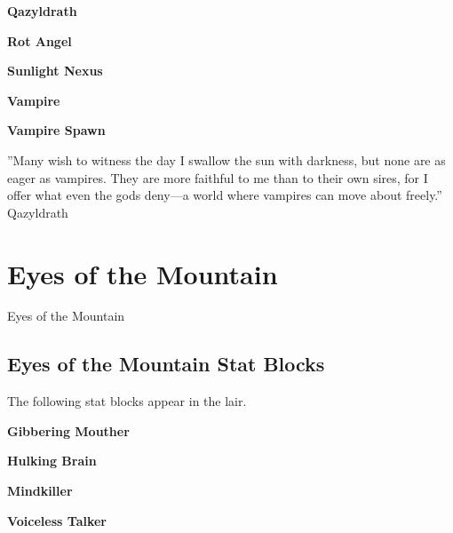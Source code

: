 \documentclass[10pt,a4paper,twoside,bg=print,twocolumn,openany,nodeprecatedcode]{dndbook}
\begin{document}
\textbf{Qazyldrath}

\textbf{Rot Angel}

\textbf{Sunlight Nexus}

\textbf{Vampire}

\textbf{Vampire Spawn}

\DndQuote%
{}
{''Many wish to witness the day I swallow the sun with darkness, but none are as eager as vampires. They are more faithful to me than to their own sires, for I offer what even the gods deny—a world where vampires can move about freely.''}
{Qazyldrath}
\chapter{Eyes of the Mountain}
Eyes of the Mountain

\section{Eyes of the Mountain Stat Blocks}
The following stat blocks appear in the lair.

\textbf{Gibbering Mouther}

\textbf{Hulking Brain}

\textbf{Mindkiller}

\textbf{Voiceless Talker}
\end{document}

